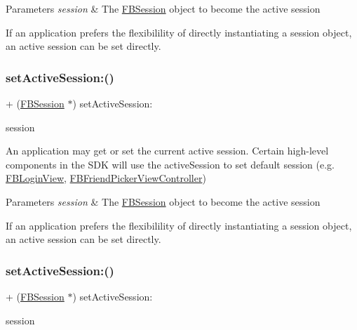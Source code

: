 \begin{DoxyParams}{Parameters}
{\em session} & The \hyperlink{interfaceFBSession}{F\+B\+Session} object to become the active session\\
\hline
\end{DoxyParams}
If an application prefers the flexibilility of directly instantiating a session object, an active session can be set directly. \mbox{\label{interfaceFBSession_af1b30bea1e3251f8d75f76b10369756e}} 
\subsubsection{\texorpdfstring{set\+Active\+Session\+:()}{setActiveSession:()}\hspace{0.1cm}{\footnotesize\ttfamily [3/5]}}
{\footnotesize\ttfamily + (\hyperlink{interfaceFBSession}{F\+B\+Session} $\ast$) set\+Active\+Session\+: \begin{DoxyParamCaption}\item[{(\hyperlink{interfaceFBSession}{F\+B\+Session} $\ast$)}]{session }\end{DoxyParamCaption}}

An application may get or set the current active session. Certain high-\/level components in the S\+DK will use the active\+Session to set default session (e.\+g. {\ttfamily \hyperlink{interfaceFBLoginView}{F\+B\+Login\+View}}, {\ttfamily \hyperlink{interfaceFBFriendPickerViewController}{F\+B\+Friend\+Picker\+View\+Controller}})


\begin{DoxyParams}{Parameters}
{\em session} & The \hyperlink{interfaceFBSession}{F\+B\+Session} object to become the active session\\
\hline
\end{DoxyParams}
If an application prefers the flexibilility of directly instantiating a session object, an active session can be set directly. \mbox{\label{interfaceFBSession_af1b30bea1e3251f8d75f76b10369756e}} 
\subsubsection{\texorpdfstring{set\+Active\+Session\+:()}{setActiveSession:()}\hspace{0.1cm}{\footnotesize\ttfamily [4/5]}}
{\footnotesize\ttfamily + (\hyperlink{interfaceFBSession}{F\+B\+Session} $\ast$) set\+Active\+Session\+: \begin{DoxyParamCaption}\item[{(\hyperlink{interfaceFBSession}{F\+B\+Session} $\ast$)}]{session }\end{DoxyParamCaption}}

